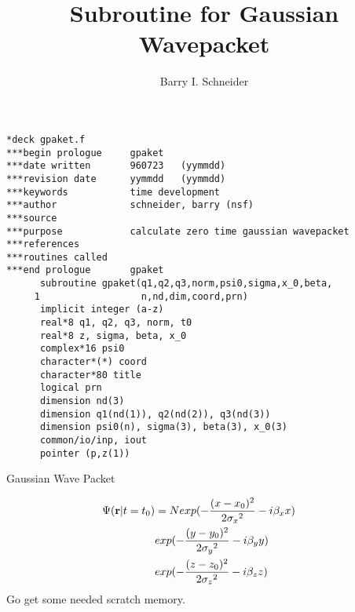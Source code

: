 \documentclass{article}
\title{Subroutine for Gaussian Wavepacket}
\author{Barry I. Schneider}
\date{}
\begin{document}
 \maketitle
\begin{verbatim}
*deck gpaket.f
***begin prologue     gpaket
***date written       960723   (yymmdd)
***revision date      yymmdd   (yymmdd)
***keywords           time development
***author             schneider, barry (nsf)
***source             
***purpose            calculate zero time gaussian wavepacket 
***references         
***routines called    
***end prologue       gpaket
      subroutine gpaket(q1,q2,q3,norm,psi0,sigma,x_0,beta,
     1                  n,nd,dim,coord,prn)
      implicit integer (a-z)
      real*8 q1, q2, q3, norm, t0
      real*8 z, sigma, beta, x_0
      complex*16 psi0
      character*(*) coord
      character*80 title
      logical prn
      dimension nd(3)
      dimension q1(nd(1)), q2(nd(2)), q3(nd(3))
      dimension psi0(n), sigma(3), beta(3), x_0(3)
      common/io/inp, iout
      pointer (p,z(1))
\end{verbatim}
 \center Gaussian Wave Packet
 \par
\begin{eqnarray}
 \Psi({\bf r}|t=t_0) & = N exp( -\frac{ ( x -x_0 )^2 }{2 { {\sigma}_x }^2 }
                                -i {\beta}_x x ) & \nonumber \\
                         &exp( -\frac{ ( y -y_0 )^2 }{2 { {\sigma}_y }^2 }
                                -i {\beta}_y y ) & \nonumber \\
                         &exp( -\frac{ ( z -z_0 )^2 }{2 { {\sigma}_z }^2 }
                                -i {\beta}_z z ) & 
 \end{eqnarray}
 Go get some needed scratch memory.
\end{document}
